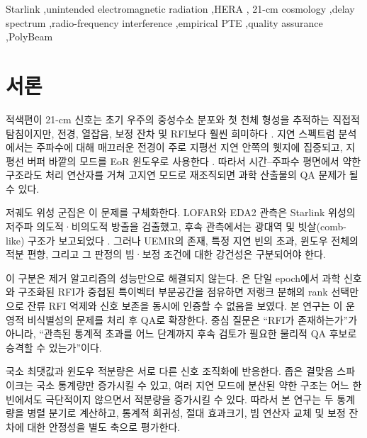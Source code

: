 \documentclass[final,5p,times]{elsarticle}
\begin{document}
\begin{frontmatter}
\begin{keyword}
Starlink \sep unintended electromagnetic radiation \sep HERA \sep
21-cm cosmology \sep delay spectrum \sep radio-frequency interference
\sep empirical PTE \sep quality assurance \sep PolyBeam
\end{keyword}

\end{frontmatter}

\section{서론}
\label{sec:intro}

적색편이 21-cm 신호는 초기 우주의 중성수소 분포와 첫 천체 형성을
추적하는 직접적 탐침이지만, 전경, 열잡음, 보정 잔차 및 RFI보다
훨씬 희미하다
\citep{furlanetto2006,pritchard2012,morales2010,deboer2017,
abdurashidova2022}. 지연 스펙트럼 분석에서는 주파수에 대해
매끄러운 전경이 주로 지평선 지연 안쪽의 웻지에 집중되고, 지평선
버퍼 바깥의 모드를 EoR 윈도우로 사용한다
\citep{parsons2012delay,pober2013,liu2014wedge,thyagarajan2015}.
따라서 시간--주파수 평면에서 약한 구조라도 처리 연산자를 거쳐
고지연 모드로 재조직되면 과학 산출물의 QA 문제가 될 수 있다.

저궤도 위성 군집은 이 문제를 구체화한다. LOFAR와 EDA2 관측은
Starlink 위성의 저주파 의도적·비의도적 방출을 검출했고, 후속
관측에서는 광대역 및 빗살(comb-like) 구조가 보고되었다
\citep{divruno2023,grigg2023,bassa2024}. 그러나 UEMR의 존재,
특정 지연 빈의 초과, 윈도우 전체의 적분 편향, 그리고 그 판정의
빔·보정 조건에 대한 강건성은 구분되어야 한다.

이 구분은 제거 알고리즘의 성능만으로 해결되지 않는다.
\citet{kim2026nonidentifiability}은 단일 epoch에서 과학 신호와
구조화된 RFI가 중첩된 특이벡터 부분공간을 점유하면 저랭크 분해의
rank 선택만으로 잔류 RFI 억제와 신호 보존을 동시에 인증할 수
없음을 보였다. 본 연구는 이 운영적 비식별성의 문제를 처리 후 QA로
확장한다. 중심 질문은 ``RFI가 존재하는가''가 아니라, ``관측된
통계적 초과를 어느 단계까지 후속 검토가 필요한 물리적 QA 후보로
승격할 수 있는가''이다.

국소 최댓값과 윈도우 적분량은 서로 다른 신호 조직화에 반응한다.
좁은 결맞음 스파이크는 국소 통계량만 증가시킬 수 있고, 여러 지연
모드에 분산된 약한 구조는 어느 한 빈에서도 극단적이지 않으면서
적분량을 증가시킬 수 있다. 따라서 본 연구는 두 통계량을 병렬
분기로 계산하고, 통계적 희귀성, 절대 효과크기, 빔 연산자 교체 및
보정 잔차에 대한 안정성을 별도 축으로 평가한다.
\end{document}
